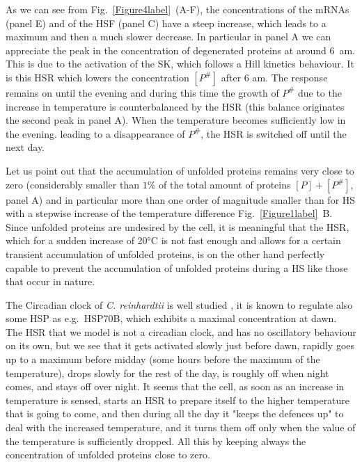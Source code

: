 \documentclass[oneside, 10pt, a4paper, twocolumn]{article}
\begin{document}
As we can see from Fig.~\ref{Figure4label}~(A-F), the concentrations of the mRNAs (panel E) and of the HSF (panel C) have a steep increase, which leads to a maximum and then a much slower decrease. In particular in panel A we can appreciate the peak in the concentration of degenerated proteins at around 6~am. This is due to the activation of the SK, which follows a Hill kinetics behaviour. It is this HSR which lowers the concentration $\left[P^\#\right]$ after 6 am. The response remains on until the evening and during this time the growth of $P^\#$  due to the increase in temperature is counterbalanced by the HSR (this balance originates the second peak in panel A). When the temperature becomes sufficiently low in the evening. leading to a disappearance of $P^\#$, the HSR is switched off until the next day. 

Let us point out that the accumulation of unfolded proteins remains very close to zero 
(considerably smaller than $1\%$ of the total amount of proteins $\left[P\right]+\left[P^\#\right]$, panel A) and in particular more than one order of magnitude smaller than for HS with a stepwise increase of the temperature difference Fig.~\ref{Figure1label}~B. Since unfolded proteins are undesired by the cell, it is meaningful that the HSR, which for a sudden increase of 20°C is not fast enough and allows for a certain transient accumulation of unfolded proteins, is on the other hand perfectly capable to prevent the accumulation of unfolded proteins during a HS like those that occur in nature. 

The Circadian clock of \emph{C. reinhardtii} is well studied \cite{Mittag2005,Jacobshagen2001}, 
it is known to regulate also some HSP as e.g.~HSP70B, which exhibits a maximal concentration at dawn. 
The HSR that we model is not a circadian clock, and has no oscillatory behaviour on its own, but we see that it gets activated slowly just before dawn, rapidly goes up to a maximum before midday (some hours before the maximum of the temperature), drops slowly for the rest of the day, is roughly off when night comes, and stays off over night. It seems that the cell, as soon as an increase in temperature is sensed, starts an HSR to prepare itself to the higher temperature that is going to come, and then during all the day it "keeps the defences up" to deal with the increased temperature, and it turns them off only when the value of the temperature is sufficiently dropped. All this by keeping always the concentration of unfolded proteins close to zero.
\end{document}
